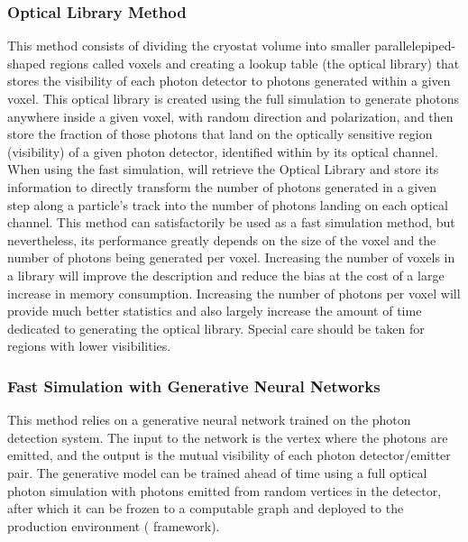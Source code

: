 \documentclass[../main-v1.tex]{subfiles}
\begin{document}
\subsubsection{Optical Library Method}

This method consists of dividing the cryostat volume into smaller parallelepiped-shaped regions called voxels and creating a lookup table 
(the optical library) 
that  stores the visibility of each photon detector to photons  generated within a given voxel.
This optical library is created using the full  simulation to generate photons anywhere inside a given voxel, with random direction and polarization, and then store the fraction of those photons that land on the optically sensitive region (visibility) of a given photon detector, identified within   by its optical channel. When using the fast simulation,   will retrieve the Optical Library and store its information to directly transform the number
of photons generated in a given step along a particle's track into the number of photons landing on each optical channel.
This method can satisfactorily 
be used as a fast simulation method, but nevertheless, 
its performance greatly depends on the size of the voxel and the number of photons being generated per voxel. Increasing the number of voxels in a library will improve the description and reduce the bias at the cost of a large increase in memory consumption. Increasing the number of photons per voxel will provide much better statistics and also largely increase the amount of time dedicated to generating the optical library. Special care should be taken for regions with 
lower visibilities.

\subsubsection{Fast Simulation with Generative Neural Networks}

This method relies on a generative neural network  trained on the photon detection system. 
The input to the network is the vertex where the photons are emitted, and the output is the mutual visibility of each photon detector/emitter pair. %
The generative model can be trained ahead of time using a full   optical photon simulation with photons emitted from random vertices in the detector, after which it can be frozen to a computable graph and deployed to the production environment (  framework).
\end{document}
